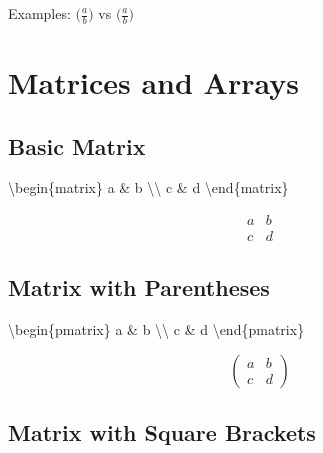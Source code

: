 \documentclass[
  letterpaper,
  DIV=11,
  numbers=noendperiod]{scrartcl}
\newenvironment{Shaded}{\begin{snugshade}}{\end{snugshade}}
\newcommand{\ExtensionTok}[1]{\textcolor[rgb]{0.00,0.23,0.31}{#1}}
\newcommand{\KeywordTok}[1]{\textcolor[rgb]{0.00,0.23,0.31}{#1}}
\newcommand{\NormalTok}[1]{\textcolor[rgb]{0.00,0.23,0.31}{#1}}
\newcommand{\SpecialCharTok}[1]{\textcolor[rgb]{0.37,0.37,0.37}{#1}}
\newcommand{\SpecialStringTok}[1]{\textcolor[rgb]{0.13,0.47,0.30}{#1}}
\begin{document}
Examples: \(\big( \frac{a}{b} \big)\) vs \(\bigg( \frac{a}{b} \bigg)\)

\hypertarget{matrices-and-arrays}{%
\section{Matrices and Arrays}\label{matrices-and-arrays}}

\hypertarget{basic-matrix}{%
\subsection{Basic Matrix}\label{basic-matrix}}

\begin{Shaded}
\begin{Highlighting}[]
\SpecialStringTok{$$}\KeywordTok{\textbackslash{}begin}\NormalTok{\{}\ExtensionTok{matrix}\NormalTok{\}}
\SpecialStringTok{a \& b }\SpecialCharTok{\textbackslash{}\textbackslash{}}
\SpecialStringTok{c \& d}
\KeywordTok{\textbackslash{}end}\NormalTok{\{}\ExtensionTok{matrix}\NormalTok{\}}\SpecialStringTok{$$}
\end{Highlighting}
\end{Shaded}

\[\begin{matrix}
a & b \\
c & d
\end{matrix}\]

\hypertarget{matrix-with-parentheses}{%
\subsection{Matrix with Parentheses}\label{matrix-with-parentheses}}

\begin{Shaded}
\begin{Highlighting}[]
\SpecialStringTok{$$}\KeywordTok{\textbackslash{}begin}\NormalTok{\{}\ExtensionTok{pmatrix}\NormalTok{\}}
\SpecialStringTok{a \& b }\SpecialCharTok{\textbackslash{}\textbackslash{}}
\SpecialStringTok{c \& d}
\KeywordTok{\textbackslash{}end}\NormalTok{\{}\ExtensionTok{pmatrix}\NormalTok{\}}\SpecialStringTok{$$}
\end{Highlighting}
\end{Shaded}

\[\begin{pmatrix}
a & b \\
c & d
\end{pmatrix}\]

\hypertarget{matrix-with-square-brackets}{%
\subsection{Matrix with Square
Brackets}\label{matrix-with-square-brackets}}
\end{document}
